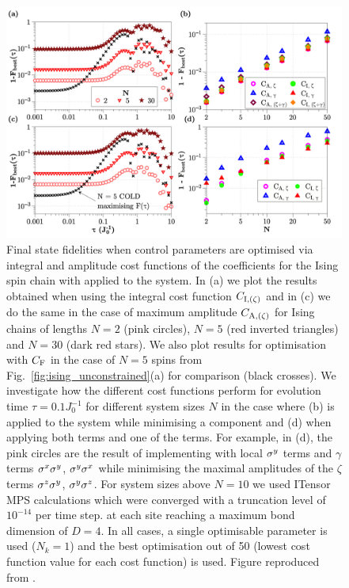 \begin{figure}[t!]
    \centering
    \includegraphics[width=\linewidth]{images/ising_max_int_plots.png} \caption[Plot of final state fidelity for the Ising spin chain for different cost functions with LCD applied.]{Final state fidelities when control parameters are optimised via integral and amplitude cost functions of the   coefficients for the Ising spin chain with   applied to the system. In (a) we plot the results obtained when using the integral cost function $C_{\rm I, (\zeta)}$ and in (c) we do the same in the case of maximum amplitude $C_{\rm A, (\zeta)}$ for Ising chains of lengths $N = 2$ (pink circles), $N = 5$ (red inverted triangles) and $N=30$ (dark red stars). We also plot results for  optimisation with $C_{\rm F}$ in the case of $N=5$ spins from Fig.~\ref{fig:ising_unconstrained}(a) for comparison (black crosses). We investigate how the different cost functions perform for evolution time $\tau = 0.1J_0^{-1}$ for different system sizes $N$ in the case where (b)   is applied to the system while minimising a  component and (d) when applying both  terms and one of the  terms. For example, in (d), the pink circles are the result of implementing  with  local $\sigma^y$ terms and $\gamma$ terms $\sigma^x\sigma^y$, $\sigma^y\sigma^x$ while minimising the maximal amplitudes of the $\zeta$ terms $\sigma^z\sigma^y$, $\sigma^y\sigma^z$. For system sizes above $N=10$ we used ITensor\cite{fishman_itensor_2022} MPS calculations which were converged with a truncation level of $10^{-14}$ per time step. at each site reaching a maximum bond dimension of $D = 4$. In all cases, a single optimisable parameter is used ($N_k = 1$) and the best optimisation out of 50 (lowest cost function value for each cost function) is used. Figure reproduced from \cite{cepaite_cold_2023}.}\label{fig:ising_minimising_ho_mainplot}
\end{figure}

